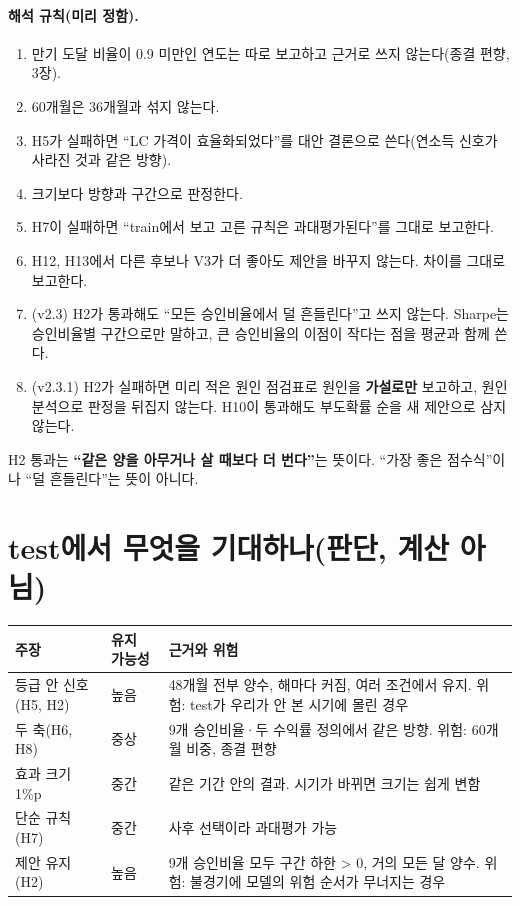 \paragraph{해석 규칙(미리 정함).}
\begin{enumerate}[leftmargin=*]
\item 만기 도달 비율이 0.9 미만인 연도는 따로 보고하고 근거로 쓰지 않는다(종결 편향, 3장).
\item 60개월은 36개월과 섞지 않는다.
\item H5가 실패하면 ``LC 가격이 효율화되었다''를 대안 결론으로 쓴다(연소득 신호가 사라진 것과 같은 방향).
\item 크기보다 방향과 구간으로 판정한다.
\item H7이 실패하면 ``train에서 보고 고른 규칙은 과대평가된다''를 그대로 보고한다.
\item H12, H13에서 다른 후보나 V3가 더 좋아도 제안을 바꾸지 않는다. 차이를 그대로 보고한다.
\item (v2.3) H2가 통과해도 ``모든 승인비율에서 덜 흔들린다''고 쓰지 않는다. Sharpe는 승인비율별 구간으로만 말하고, 큰 승인비율의 이점이 작다는 점을 평균과 함께 쓴다.
\item (v2.3.1) H2가 실패하면 미리 적은 원인 점검표로 원인을 \textbf{가설로만} 보고하고, 원인 분석으로 판정을 뒤집지 않는다. H10이 통과해도 부도확률 순을 새 제안으로 삼지 않는다.
\end{enumerate}

\begin{warnbox}
H2 통과는 \textbf{``같은 양을 아무거나 살 때보다 더 번다''}는 뜻이다. ``가장 좋은 점수식''이나 ``덜 흔들린다''는 뜻이 아니다.
\end{warnbox}

\section{test에서 무엇을 기대하나(판단, 계산 아님)}
\begin{table}[H]\centering\small
\begin{tabularx}{\linewidth}{@{}p{40mm}p{22mm}L@{}}\toprule
주장 & 유지 가능성 & 근거와 위험\\\midrule
등급 안 신호(H5, H2) & 높음 & 48개월 전부 양수, 해마다 커짐, 여러 조건에서 유지. 위험: test가 우리가 안 본 시기에 몰린 경우\\
두 축(H6, H8) & 중상 & 9개 승인비율·\allowbreak{}두 수익률 정의에서 같은 방향. 위험: 60개월 비중, 종결 편향\\
효과 크기 1\%p & 중간 & 같은 기간 안의 결과. 시기가 바뀌면 크기는 쉽게 변함\\
단순 규칙(H7) & 중간 & 사후 선택이라 과대평가 가능\\
제안 유지(H2) & 높음 & 9개 승인비율 모두 구간 하한 > 0, 거의 모든 달 양수. 위험: 불경기에 모델의 위험 순서가 무너지는 경우\\\bottomrule
\end{tabularx}
\end{table}

